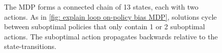\begin{figure}[b]
\begin{minipage}[b]{0.48\textwidth}
    \vspace{0.5cm}
    \caption{The MDP forms a connected chain of 13 states, each with two actions. 
    As in \autoref{fig: explain loop on-policy bias MDP}, solutions cycle between suboptimal policies that only contain 1 or 2 suboptimal actions.
    The suboptimal action propagates backwards relative to the state-transitions.}
    \label{fig: long MDP}
    \end{minipage}
    \hfill
    \begin{minipage}[b]{0.48\textwidth}

\end{minipage}
\end{figure}
